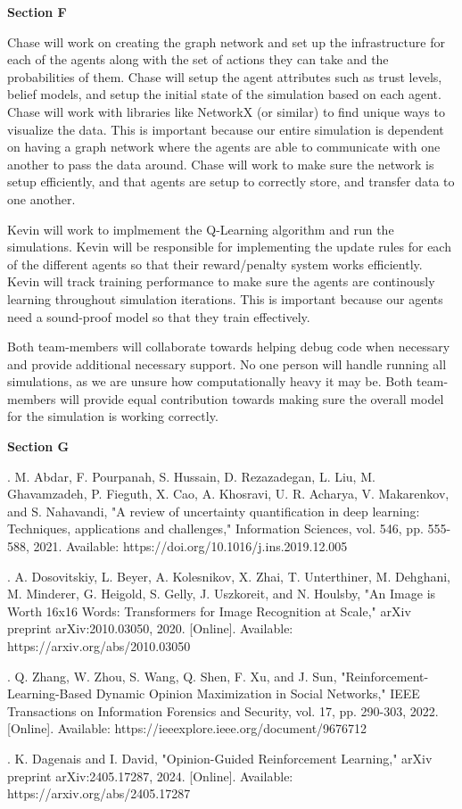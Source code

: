 \documentclass[12pt,twoside]{article}
\begin{document}
\textbf{Section F}

Chase will work on creating the graph network and set up the infrastructure for each of the agents along with the set of actions they can take and the probabilities of them. Chase will setup the agent attributes such as trust levels, belief models, and setup the initial state of the simulation based on each agent. Chase will work with libraries like NetworkX (or similar) to find unique ways to visualize the data. This is important because our entire simulation is dependent on having a graph network where the agents are able to communicate with one another to pass the data around. Chase will work to make sure the network is setup efficiently, and that agents are setup to correctly store, and transfer data to one another.

Kevin will work to implmement the Q-Learning algorithm and run the simulations. Kevin will be responsible for implementing the update rules for each of the different agents so that their reward/penalty system works efficiently. Kevin will track training performance to make sure the agents are continously learning throughout simulation iterations. This is important because our agents need a sound-proof model so that they train effectively. 

Both team-members will collaborate towards helping debug code when necessary and provide additional necessary support. No one person will handle running all simulations, as we are unsure how computationally heavy it may be. Both team-members will provide equal contribution towards making sure the overall model for the simulation is working correctly. 

\textbf{Section G}

. M. Abdar, F. Pourpanah, S. Hussain, D. Rezazadegan, L. Liu, M. Ghavamzadeh, P. Fieguth, X. Cao, A. Khosravi, U. R. Acharya, V. Makarenkov, and S. Nahavandi, "A review of uncertainty quantification in deep learning: Techniques, applications and challenges," Information Sciences, vol. 546, pp. 555-588, 2021. Available: https://doi.org/10.1016/j.ins.2019.12.005

. A. Dosovitskiy, L. Beyer, A. Kolesnikov, X. Zhai, T. Unterthiner, M. Dehghani, M. Minderer, G. Heigold, S. Gelly, J. Uszkoreit, and N. Houlsby, "An Image is Worth 16x16 Words: Transformers for Image Recognition at Scale," arXiv preprint arXiv:2010.03050, 2020. [Online]. Available: https://arxiv.org/abs/2010.03050

. Q. Zhang, W. Zhou, S. Wang, Q. Shen, F. Xu, and J. Sun, "Reinforcement-Learning-Based Dynamic Opinion Maximization in Social Networks," IEEE Transactions on Information Forensics and Security, vol. 17, pp. 290-303, 2022. [Online]. Available: https://ieeexplore.ieee.org/document/9676712

. K. Dagenais and I. David, "Opinion-Guided Reinforcement Learning," arXiv preprint arXiv:2405.17287, 2024. [Online]. Available: https://arxiv.org/abs/2405.17287
\end{document}

